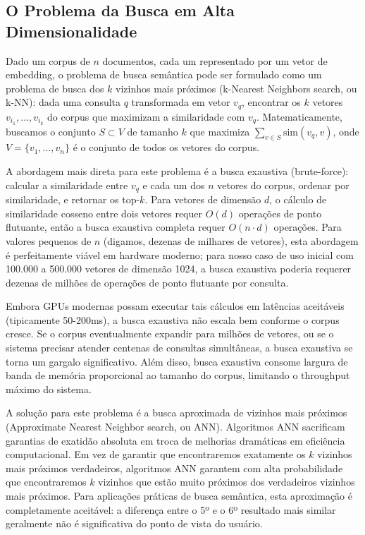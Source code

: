 \documentclass[12pt,a4paper]{article}
\begin{document}
\subsection{O Problema da Busca em Alta Dimensionalidade}

Dado um corpus de $n$ documentos, cada um representado por um vetor de embedding, o problema de busca semântica pode ser formulado como um problema de busca dos $k$ vizinhos mais próximos (k-Nearest Neighbors search, ou k-NN): dada uma consulta $q$ transformada em vetor $v_q$, encontrar os $k$ vetores $v_{i_1}, ..., v_{i_k}$ do corpus que maximizam a similaridade com $v_q$. Matematicamente, buscamos o conjunto $S \subset V$ de tamanho $k$ que maximiza $\sum_{v \in S} \text{sim}(v_q, v)$, onde $V = \{v_1, ..., v_n\}$ é o conjunto de todos os vetores do corpus.

A abordagem mais direta para este problema é a busca exaustiva (brute-force): calcular a similaridade entre $v_q$ e cada um dos $n$ vetores do corpus, ordenar por similaridade, e retornar os top-$k$. Para vetores de dimensão $d$, o cálculo de similaridade cosseno entre dois vetores requer $O(d)$ operações de ponto flutuante, então a busca exaustiva completa requer $O(n \cdot d)$ operações. Para valores pequenos de $n$ (digamos, dezenas de milhares de vetores), esta abordagem é perfeitamente viável em hardware moderno; para nosso caso de uso inicial com 100.000 a 500.000 vetores de dimensão 1024, a busca exaustiva poderia requerer dezenas de milhões de operações de ponto flutuante por consulta.

Embora GPUs modernas possam executar tais cálculos em latências aceitáveis (tipicamente 50-200ms), a busca exaustiva não escala bem conforme o corpus cresce. Se o corpus eventualmente expandir para milhões de vetores, ou se o sistema precisar atender centenas de consultas simultâneas, a busca exaustiva se torna um gargalo significativo. Além disso, busca exaustiva consome largura de banda de memória proporcional ao tamanho do corpus, limitando o throughput máximo do sistema.

A solução para este problema é a busca aproximada de vizinhos mais próximos (Approximate Nearest Neighbor search, ou ANN). Algoritmos ANN sacrificam garantias de exatidão absoluta em troca de melhorias dramáticas em eficiência computacional. Em vez de garantir que encontraremos exatamente os $k$ vizinhos mais próximos verdadeiros, algoritmos ANN garantem com alta probabilidade que encontraremos $k$ vizinhos que estão muito próximos dos verdadeiros vizinhos mais próximos. Para aplicações práticas de busca semântica, esta aproximação é completamente aceitável: a diferença entre o 5º e o 6º resultado mais similar geralmente não é significativa do ponto de vista do usuário.
\end{document}
